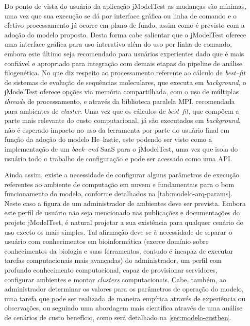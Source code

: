 \documentclass[english,brazilian]{UNISINOSmonografia} %
\begin{document}
Do ponto de vista do usuário da aplicação jModelTest as mudanças são mínimas, uma vez que sua execução se dá por interface gráfica ou linha de comando e o efetivo processamento já ocorre em plano de fundo, assim como é previsto com a adoção do modelo proposto.
Desta forma cabe salientar que o jModelTest oferece uma interface gráfica para uso interativo além do uso por linha de comando, embora este último seja recomendado para usuários experientes dado que é mais confiável e apropriado para integração com demais etapas do pipeline de análise filogenética.
No que diz respeito ao processamento referente ao cálculo de \textit{best--fit} de sistemas de evolução de sequências moleculares, que executa em \textit{background}, o jModelTest oferece opções via memória compartilhada, com o uso de múltiplas \textit{threads} de processamento, e através da biblioteca paralela MPI, recomendada para ambientes de \textit{cluster}.
Uma vez que os cálculos de \textit{best--fit}, que compõem a parte mais relevante do custo computacional, já são executados em \textit{background}, não é esperado impacto no uso da ferramenta por parte do usuário final em função da adoção do modelo \textsf{He}--lastic, este podendo ser visto como a implementação de um \textit{back--end} SaaS para o jModelTest, uma vez que isola do usuário todo o trabalho de configuração e pode ser acessado como uma API.



Ainda assim, existe a necessidade de configurar alguns parâmetros de execução referentes ao ambiente de computação em nuvem e fundamentais para o bom funcionamento do modelo, conforme detalhados na \autoref{tab:modelo-arq-params}.
Neste caso a figura de um administrador de ambientes deve ser prevista.
Embora este perfil de usuário não seja mencionado nas publicações e documentações do projeto jModelTest, é natural projetar a sua existência para qualquer cenário de uso exceto os mais simples.
Tal afirmação deve-se à necessidade de separar o usuário com conhecimentos em bioinformática (exerce domínio sobre conhecimentos da biologia e suas ferramentas, contudo é incapaz de executar tarefas computacionais mais avançadas) do administrador, um perfil com profundo conhecimento computacional, capaz de provisionar servidores, configurar ambientes e montar \textit{clusters} computacionais.
%
Cabe, também, ao administrador determinar os valores para os parâmetros de operação do modelo, uma tarefa que pode ser realizada de maneira empírica através de experiência ou observações, ou seguindo uma abordagem mais científica através de uma análise de cenários de custo benefício, como será detalhado na \autoref{sec:modelo-custben}.
\end{document}
